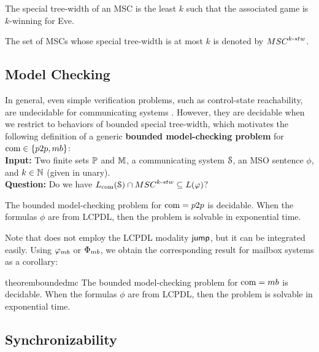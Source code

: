 \documentclass[a4paper,UKenglish,cleveref, autoref, thm-restate]{lipics-v2021}
\begin{document}
\begin{fact}
	The special tree-width of an MSC is the least $k$ such that
	the associated game is $k$-winning for Eve.
\end{fact}

The set of MSCs whose special tree-width is at most $k$ is denoted by $\stwMSCs{k}$.


\subsection{Model Checking}

In general, even simple verification problems, such
as control-state reachability, are undecidable for
communicating systems \cite{DBLP:journals/jacm/BrandZ83}.
However, they are decidable when we restrict to behaviors of
bounded special tree-width, which motivates the following
definition of a generic {\bf bounded model-checking problem} for $\comsymb \in \{\ppsymb, \mbsymb\}$:\\
%
{\bf Input:} Two finite sets $\mathbb{P}$ and $\mathbb{M}$, a communicating system $\mathcal{S}$, an MSO sentence $\phi$, and $k \in \mathbb{N}$ (given in unary).\\
%
{\bf Question:} Do we have $\cL{\Sys} \cap \stwMSCs{k} \subseteq L(\phi)$?


\begin{fact}\label{p2p}
The bounded model-checking problem for $\comsymb = \ppsymb$ is decidable.
When the formulas $\phi$ are from LCPDL, then the problem is solvable
in exponential time.
\end{fact}

Note that \cite{DBLP:journals/corr/abs-1904-06942} does not employ
the LCPDL modality $\textsf{jump}$, but it can be integrated easily.
Using $\mbformula$ or $\mbFormula$, we obtain the corresponding result
for mailbox systems as a corollary:

\begin{restatable}{theorem}{boundedmc}
\label{mailbox}
The bounded model-checking problem for $\comsymb =  \mbsymb$ is decidable.
When the formulas $\phi$ are from LCPDL, then the problem is solvable
in exponential time.
\end{restatable}

\subsection{Synchronizability}
\end{document}
